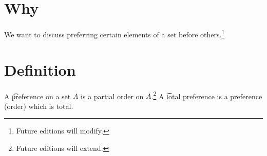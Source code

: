 

\section*{Why}

We want to discuss preferring certain elements of a set before others.\footnote{Future editions will modify.}

\section*{Definition}

A \t{preference} on a set $A$ is a partial order on $A$.\footnote{Future editions will extend.}
A \t{total preference} is a preference (order) which is total.

\blankpage